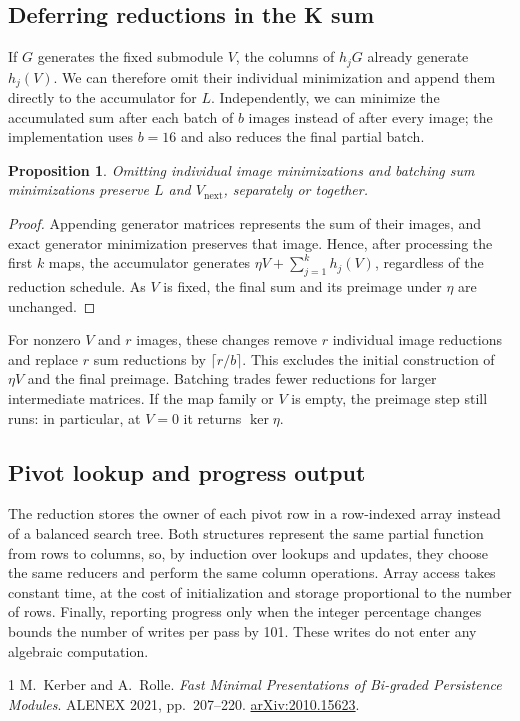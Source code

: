 \documentclass[11pt,a4paper]{article}
\newtheorem{proposition}{Proposition}
\begin{document}
\subsection{Deferring reductions in the K sum}
If $G$ generates the fixed submodule $V$, the columns of $h_jG$ already
generate $h_j(V)$. We can therefore omit their individual minimization
and append them directly to the accumulator for $L$. Independently, we
can minimize the accumulated sum after each batch of $b$ images instead
of after every image; the implementation uses $b=16$ and also reduces
the final partial batch.

\begin{proposition}
Omitting individual image minimizations and batching sum minimizations
preserve $L$ and $V_{\mathrm{next}}$, separately or together.
\end{proposition}
\begin{proof}
Appending generator matrices represents the sum of their images, and
exact generator minimization preserves that image. Hence, after processing
the first $k$ maps, the accumulator generates
$\eta V+\sum_{j=1}^{k}h_j(V)$, regardless of the reduction schedule.
As $V$ is fixed, the final sum and its preimage under $\eta$ are unchanged.
\end{proof}

For nonzero $V$ and $r$ images, these changes remove $r$ individual image reductions and
replace $r$ sum reductions by $\lceil r/b\rceil$. This excludes the
initial construction of $\eta V$ and the final preimage. Batching trades
fewer reductions for larger intermediate matrices. If the map family or
$V$ is empty, the preimage step still runs: in particular, at $V=0$ it
returns $\ker\eta$.

\subsection{Pivot lookup and progress output}
The reduction stores the owner of each pivot row in a row-indexed array
instead of a balanced search tree. Both structures represent the same
partial function from rows to columns, so, by induction over lookups and
updates, they choose the same reducers and perform the same column
operations. Array access takes constant time, at the cost of initialization
and storage proportional to the number of rows. Finally, reporting progress
only when the integer percentage changes bounds the number of writes per
pass by 101. These writes do not enter any algebraic computation.

\begin{thebibliography}{1}
M.~Kerber and A.~Rolle.
\emph{Fast Minimal Presentations of Bi-graded Persistence Modules}.
ALENEX 2021, pp.~207--220.
\href{https://arxiv.org/abs/2010.15623}{arXiv:2010.15623}.
\end{thebibliography}
\end{document}

